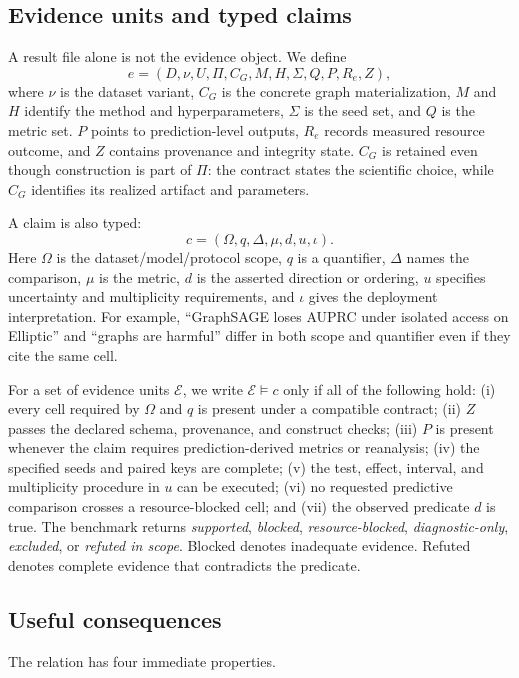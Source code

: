 \subsection{Evidence units and typed claims}
A result file alone is not the evidence object. We define
\begin{equation}
 e=(D,\nu,U,\Pi,C_G,M,H,\Sigma,Q,P,R_e,Z),
 \label{eq:evidence-unit}
\end{equation}
where $\nu$ is the dataset variant, $C_G$ is the concrete graph materialization, $M$ and $H$ identify the method and hyperparameters, $\Sigma$ is the seed set, and $Q$ is the metric set. $P$ points to prediction-level outputs, $R_e$ records measured resource outcome, and $Z$ contains provenance and integrity state. $C_G$ is retained even though construction is part of $\Pi$: the contract states the scientific choice, while $C_G$ identifies its realized artifact and parameters.

A claim is also typed:
\begin{equation}
 c=(\Omega,q,\Delta,\mu,d,u,\iota).
 \label{eq:typed-claim}
\end{equation}
Here $\Omega$ is the dataset/model/protocol scope, $q$ is a quantifier, $\Delta$ names the comparison, $\mu$ is the metric, $d$ is the asserted direction or ordering, $u$ specifies uncertainty and multiplicity requirements, and $\iota$ gives the deployment interpretation. For example, ``GraphSAGE loses AUPRC under isolated access on Elliptic'' and ``graphs are harmful'' differ in both scope and quantifier even if they cite the same cell.

For a set of evidence units $\mathcal{E}$, we write $\mathcal{E}\models c$ only if all of the following hold: (i) every cell required by $\Omega$ and $q$ is present under a compatible contract; (ii) $Z$ passes the declared schema, provenance, and construct checks; (iii) $P$ is present whenever the claim requires prediction-derived metrics or reanalysis; (iv) the specified seeds and paired keys are complete; (v) the test, effect, interval, and multiplicity procedure in $u$ can be executed; (vi) no requested predictive comparison crosses a resource-blocked cell; and (vii) the observed predicate $d$ is true. The benchmark returns \emph{supported}, \emph{blocked}, \emph{resource-blocked}, \emph{diagnostic-only}, \emph{excluded}, or \emph{refuted in scope}. Blocked denotes inadequate evidence. Refuted denotes complete evidence that contradicts the predicate.

\subsection{Useful consequences}
The relation has four immediate properties.

